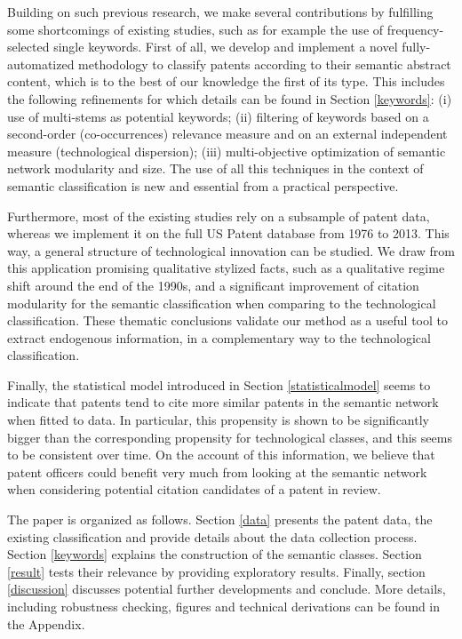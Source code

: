 \documentclass[article]{article}%
\begin{document}
Building on such previous research, we make several contributions by fulfilling some shortcomings of existing studies, such as for example the use of frequency-selected single keywords. First of all, we develop and implement a novel fully-automatized methodology to classify patents according to their semantic abstract content, which is to the best of our knowledge the first of its type. This includes the following refinements for which details can be found in Section \ref{keywords}: (i) use of multi-stems as potential keywords; (ii) filtering of keywords based on a second-order (co-occurrences) relevance measure and on an external independent measure (technological dispersion); (iii) multi-objective optimization of semantic network modularity and size. The use of all this techniques in the context of semantic classification is new and essential from a practical perspective. 

Furthermore, most of the existing studies rely on a subsample of patent data, whereas we implement it on the full US Patent database from 1976 to 2013. This way, a general structure of technological innovation can be studied. We draw from this application promising qualitative stylized facts, such as a qualitative regime shift around the end of the 1990s, and a significant improvement of citation modularity for the semantic classification when comparing to the technological classification. These thematic conclusions validate our method as a useful tool to extract endogenous information, in a complementary way to the technological classification.

Finally, the statistical model introduced in Section \ref{statisticalmodel} seems to indicate that patents tend to cite more similar patents in the semantic network  when fitted to data. In particular, this propensity is shown to be significantly bigger than the corresponding propensity for technological classes, and this seems to be consistent over time. On the account of this information, we believe that patent officers could benefit very much from looking at the semantic network when considering potential citation candidates of a patent in review.

The paper is organized as follows. Section \ref{data} presents the patent data, the existing classification and provide details about the data collection process. Section \ref{keywords} explains the construction of the semantic classes. Section \ref{result} tests their relevance by providing exploratory results. Finally, section \ref{discussion} discusses potential further developments and conclude. More details, including robustness checking, figures and technical derivations can be found in the Appendix.
\end{document}
